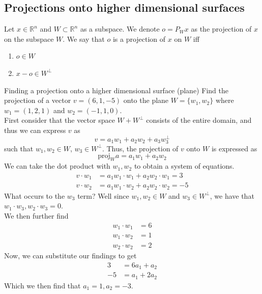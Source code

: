 \documentclass[journal, letterpaper]{IEEEtran}
\begin{document}
    \subsection{Projections onto higher dimensional surfaces}
    Let $x \in \mathbb{R}^n$ and $W \subset \mathbb{R}^n$ as a subspace. We denote $o = P_Wx$ as the projection of $x$ on the subspace $W$. We say that $o$ is a projection of $x$ on $W$ iff
    \begin{enumerate}
        \item $o \in W$
        \item $x - o \in W^\perp$
    \end{enumerate}
    \begin{myboxg}{Finding a projection onto a higher dimensional surface (plane)} \newline 
    Find the projection of a vector $v = (6, 1, -5)$ onto the plane $W = \{w_1, w_2 \}$ where $w_1 = (1, 2, 1)$ and $w_2 = (-1, 1, 0)$.
    \newline \\ 
    First consider that the vector space $W + W^\perp$ consists of the entire domain, and thus we can express $v$ as
    $$ v = a_1w_1 + a_2w_2 + a_3w^\perp_3$$
    such that $w_1, w_2 \in W$, $w_3 \in W^{\perp}$. Thus, the projection of $v$ onto $W$ is expressed as
    $$ \text{proj}_Wa = a_1w_1 + a_2w_2$$
    We can take the dot product with $w_1, w_2$ to obtain a system of equations.
    \begin{align*}
        v \cdot w_1 &= a_1w_1 \cdot w_1 + a_2w_2 \cdot w_1 = 3\\ 
        v \cdot w_2 &= a_1w_1 \cdot w_2 + a_2w_2 \cdot w_2 = -5
    \end{align*}
    What occurs to the $w_3$ term? Well since $w_1, w_2 \in W$ and $w_3 \in W^\perp$, we have that $w_1\cdot w_3, w_2\cdot w_3 = 0$.
    \newline \\ 
    We then further find
    \begin{align*}
        w_1 \cdot w_1 &= 6 \\ 
        w_1 \cdot w_2 &= 1 \\
        w_2 \cdot w_2 &= 2
    \end{align*}
    Now, we can substitute our findings to get
    \begin{align*}
        3 &= 6a_1 + a_2 \\ 
        -5 &= a_1 + 2a_2
    \end{align*}
    Which we then find that $a_1 = 1, a_2 = -3$.
    \end{myboxg}
\end{document}
